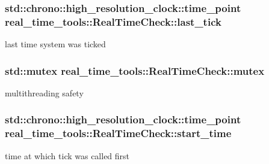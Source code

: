 \subsubsection[{\texorpdfstring{last\+\_\+tick}{last_tick}}]{\setlength{\rightskip}{0pt plus 5cm}std\+::chrono\+::high\+\_\+resolution\+\_\+clock\+::time\+\_\+point real\+\_\+time\+\_\+tools\+::\+Real\+Time\+Check\+::last\+\_\+tick\hspace{0.3cm}{\ttfamily [private]}}\hypertarget{classreal__time__tools_1_1RealTimeCheck_a3e200c0376362dcc9a7db7d77a124931}{}\label{classreal__time__tools_1_1RealTimeCheck_a3e200c0376362dcc9a7db7d77a124931}
last time system was ticked 
\subsubsection[{\texorpdfstring{mutex}{mutex}}]{\setlength{\rightskip}{0pt plus 5cm}std\+::mutex real\+\_\+time\+\_\+tools\+::\+Real\+Time\+Check\+::mutex\hspace{0.3cm}{\ttfamily [private]}}\hypertarget{classreal__time__tools_1_1RealTimeCheck_a3a7cc4ef87fac5e4052a3240aced88d1}{}\label{classreal__time__tools_1_1RealTimeCheck_a3a7cc4ef87fac5e4052a3240aced88d1}
multithreading safety 
\subsubsection[{\texorpdfstring{start\+\_\+time}{start_time}}]{\setlength{\rightskip}{0pt plus 5cm}std\+::chrono\+::high\+\_\+resolution\+\_\+clock\+::time\+\_\+point real\+\_\+time\+\_\+tools\+::\+Real\+Time\+Check\+::start\+\_\+time\hspace{0.3cm}{\ttfamily [private]}}\hypertarget{classreal__time__tools_1_1RealTimeCheck_a969600ce8ecc4ec48bbf59e8d669749e}{}\label{classreal__time__tools_1_1RealTimeCheck_a969600ce8ecc4ec48bbf59e8d669749e}
time at which tick was called first 
